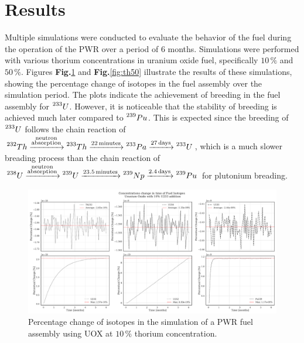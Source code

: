 \section{Results}
Multiple simulations were conducted to evaluate the behavior of the fuel during the operation of the PWR over a period of 6 months. Simulations were performed with various thorium concentrations in uranium oxide fuel, specifically \(10 \, \%\) and \(50 \, \%\). Figures \textbf{Fig.}\ref{fig:th10} and \textbf{Fig.}\ref{fig:th50} illustrate the results of these simulations, showing the percentage change of isotopes in the fuel assembly over the simulation period. The plots indicate the achievement of breeding in the fuel assembly for \(\prescript{233}{}{U}\). However, it is noticeable that the stability of breeding is achieved much later compared to \(\prescript{239}{}{Pu}\). This is expected since the breeding of \(\prescript{233}{}{U}\) follows the chain reaction of \(\prescript{232}{}{Th} \xrightarrow{\substack{\text{neutron} \\ \text{absorption}}} \prescript{233}{}{Th} \xrightarrow{22 \, \text{minutes}} \prescript{233}{}{Pa} \xrightarrow{27 \, \text{days}} \prescript{233}{}{U}\), which is a much slower breading process than the chain reaction of \(\prescript{238}{}{U} \xrightarrow{\substack{\text{neutron} \\ \text{absorption}}} \prescript{239}{}{U} \xrightarrow{23.5 \, \text{minutes}} \prescript{239}{}{Np} \xrightarrow{2.4 \, \text{days}} \prescript{239}{}{Pu}\) for plutonium breading.

\begin{figure}[h]
    \centering
    \includegraphics[width=1\textwidth]{Kap7/Figures_Kap7/percentual_change_th232_con_10.pdf}
    \caption{Percentage change of isotopes in the simulation of a PWR fuel assembly using UOX at \(10 \, \%\) thorium concentration.}
    \label{fig:th10}
\end{figure}

